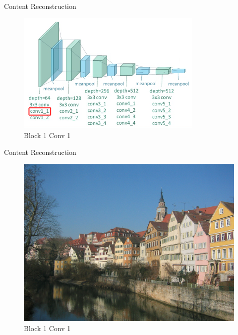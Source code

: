 \documentclass{beamer}
\begin{document}
\begin{frame}{Content Reconstruction}
\begin{figure}[ht]
\centering
\includegraphics[width=0.8\textwidth]{img/vgg19/content/block1_conv1}
\caption*{Block 1 Conv 1}
\end{figure}
\end{frame}

\begin{frame}{Content Reconstruction}
\begin{figure}[ht]
\centering
\includegraphics[width=.8\textwidth]{img/content/block1_conv1}
\caption*{Block 1 Conv 1}
\end{figure}
\end{frame}
\end{document}
